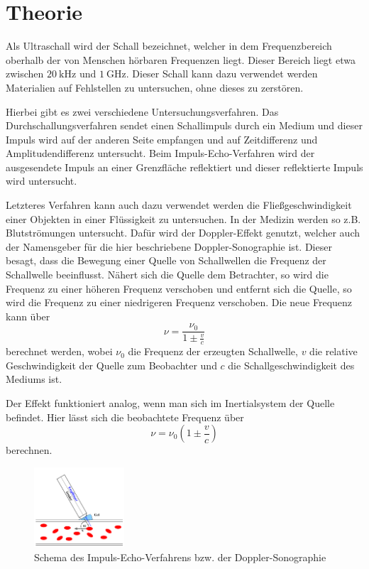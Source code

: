 \section{Theorie}
\label{sec:Theorie}

Als Ultraschall wird der Schall bezeichnet, welcher in dem Frequenzbereich oberhalb der von Menschen hörbaren Frequenzen liegt.
Dieser Bereich liegt etwa zwischen $\SI{20}{\kilo\hertz}$ und $\SI{1}{\giga\hertz}$.
Dieser Schall kann dazu verwendet werden Materialien auf Fehlstellen zu untersuchen, ohne dieses zu zerstören.

Hierbei gibt es zwei verschiedene Untersuchungsverfahren.
Das Durchschallungsverfahren sendet einen Schallimpuls durch ein Medium und dieser Impuls wird auf der anderen Seite empfangen und auf Zeitdifferenz und Amplitudendifferenz untersucht.
Beim Impuls-Echo-Verfahren wird der ausgesendete Impuls an einer Grenzfläche reflektiert und dieser reflektierte Impuls wird untersucht.

Letzteres Verfahren kann auch dazu verwendet werden die Fließgeschwindigkeit einer Objekten in einer Flüssigkeit zu untersuchen.
In der Medizin werden so z.B. Blutströmungen untersucht.
Dafür wird der Doppler-Effekt genutzt, welcher auch der Namensgeber für die hier beschriebene Doppler-Sonographie ist.
Dieser besagt, dass die Bewegung einer Quelle von Schallwellen die Frequenz der Schallwelle beeinflusst.
Nähert sich die Quelle dem Betrachter, so wird die Frequenz zu einer höheren Frequenz verschoben und entfernt sich die Quelle, so wird die Frequenz zu einer niedrigeren Frequenz verschoben.
Die neue Frequenz kann über
\begin{equation}
    \nu = \frac{\nu_0}{1 \pm \frac{v}{c}}
    \label{eq:frequenz_quellenbewegung}
\end{equation}
berechnet werden, wobei $\nu_0$ die Frequenz der erzeugten Schallwelle, $v$ die relative Geschwindigkeit der Quelle zum Beobachter und $c$ die Schallgeschwindigkeit des Mediums ist.

Der Effekt funktioniert analog, wenn man sich im Inertialsystem der Quelle befindet. 
Hier lässt sich die beobachtete Frequenz über
\begin{equation}
    \nu = \nu_0 \left( 1 \pm \frac{v}{c} \right)
    \label{eq:frequenz_beobachterbewegung}
\end{equation}
berechnen.

\begin{figure}
    \centering
    \includegraphics[width=0.3\textwidth]{images/skizze_1.png}
    \caption{Schema des Impuls-Echo-Verfahrens bzw. der Doppler-Sonographie \cite{US3}}
    \label{fig:skizze_alpha}
\end{figure}

